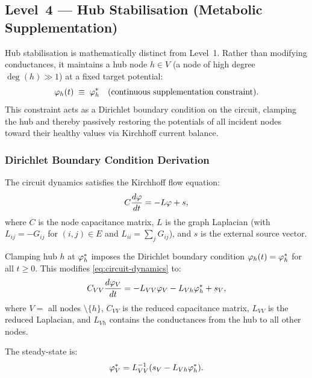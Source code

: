 \subsection{Level~4 — Hub Stabilisation (Metabolic Supplementation)}
\label{sec:level4}

Hub stabilisation is mathematically distinct from Level~1.  Rather than
modifying conductances, it maintains a hub node $h \in V$ (a node of high
degree $\deg(h) \gg 1$) at a fixed target potential:
\begin{equation}
  \varphi_h(t) \;\equiv\; \varphi_h^*
  \quad \text{(continuous supplementation constraint)}.
  \label{eq:hub-stabilisation}
\end{equation}
This constraint acts as a Dirichlet boundary condition on the circuit, clamping
the hub and thereby passively restoring the potentials of all incident nodes
toward their healthy values via Kirchhoff current balance.

\subsubsection{Dirichlet Boundary Condition Derivation}

The circuit dynamics satisfies the Kirchhoff flow equation:
\begin{equation}
  C \frac{d\varphi}{dt} = -L \varphi + s,
  \label{eq:circuit-dynamics}
\end{equation}
where $C$ is the node capacitance matrix, $L$ is the graph Laplacian
(with $L_{ij} = -G_{ij}$ for $(i,j) \in E$ and $L_{ii} = \sum_j G_{ij}$),
and $s$ is the external source vector.

Clamping hub $h$ at $\varphi_h^*$ imposes the Dirichlet boundary
condition $\varphi_h(t) = \varphi_h^*$ for all $t \geq 0$.  This
modifies \eqref{eq:circuit-dynamics} to:
\begin{equation}
  C_{VV} \frac{d\varphi_V}{dt}
  = -L_{VV} \varphi_V - L_{Vh} \varphi_h^* + s_V,
  \label{eq:dirichlet-dynamics}
\end{equation}
where $V = $ all nodes $\setminus \{h\}$, $C_{VV}$ is the reduced capacitance
matrix, $L_{VV}$ is the reduced Laplacian, and $L_{Vh}$ contains the
conductances from the hub to all other nodes.

The steady-state is:
\begin{equation}
  \varphi_V^* = L_{VV}^{-1}(s_V - L_{Vh}\varphi_h^*).
  \label{eq:hub-steady-state}
\end{equation}

